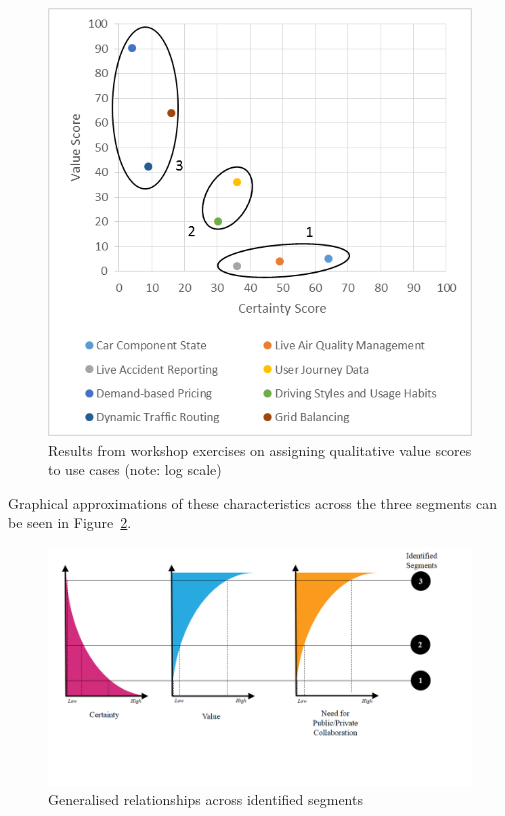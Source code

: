 \documentclass[journal]{IEEEtran}
\begin{document}
\begin{figure}[!ht]
\centering
\includegraphics[width=\columnwidth]{images/valuegraph.png}
\caption{Results from workshop exercises on assigning qualitative
value scores to use cases (note: log scale)}
\label{fig:valuegraph}
\end{figure}

Graphical approximations of these characteristics across the three
segments can be seen in Figure~\ref{fig:segmentcharacteristics}.

\begin{figure}[!htb]
\centering
\includegraphics[width=\columnwidth]{images/segmentcharacteristics.png}
\caption{Generalised relationships across identified segments}
\label{fig:segmentcharacteristics}
\end{figure}
\end{document}
